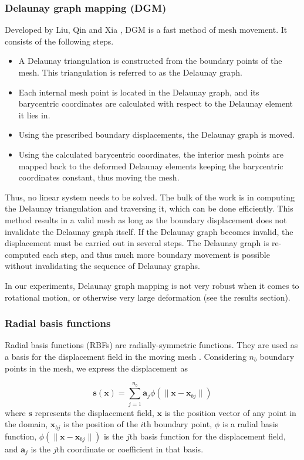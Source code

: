 \documentclass[letterpaper,11pt]{article}
\begin{document}
\subsubsection{Delaunay graph mapping (DGM)}
Developed by Liu, Qin and Xia \cite{mm:dgm}, DGM is a fast method of mesh movement. It consists of the following steps.
\begin{itemize}
\item A Delaunay triangulation is constructed from the boundary points of the mesh. This triangulation is referred to as the Delaunay graph.
\item Each internal mesh point is located in the Delaunay graph, and its barycentric coordinates are calculated with respect to the Delaunay element it lies in.
\item Using the prescribed boundary displacements, the Delaunay graph is moved.
\item Using the calculated barycentric coordinates, the interior mesh points are mapped back to the deformed Delaunay elements keeping the barycentric coordinates constant, thus moving the mesh.
\end{itemize}
Thus, no linear system needs to be solved. The bulk of the work is in computing the Delaunay triangulation and traversing it, which can be done efficiently. This method results in a valid mesh as long as the boundary displacement does not invalidate the Delaunay graph itself. If the Delaunay graph becomes invalid, the displacement must be carried out in several steps. The Delaunay graph is re-computed each step, and thus much more boundary movement is possible without invalidating the sequence of Delaunay graphs.

In our experiments, Delaunay graph mapping is not very robust when it comes to rotational motion, or otherwise very large deformation (see the results section).

\subsubsection{Radial basis functions}

Radial basis functions (RBFs) are radially-symmetric functions. They are used as a basis for the displacement field in the moving mesh \cite{mm:rbf}. Considering $n_b$ boundary points in the mesh, we express the displacement as

\begin{equation}
\mathbf{s}(\mathbf{x}) = \sum_{j=1}^{n_b} \mathbf{a}_j \phi(\lVert\mathbf{x} - \mathbf{x}_{bj}\rVert)
\label{eqn:rbf}
\end{equation}
where $\mathbf{s}$ represents the displacement field, $\mathbf{x}$ is the position vector of any point in the domain, $\mathbf{x}_{bj}$ is the position of the $i$th boundary point, $\phi$ is a radial basis function, $\phi(\lVert\mathbf{x} - \mathbf{x}_{bj}\rVert)$ is the $j$th basis function for the displacement field, and $\mathbf{a}_j$ is the $j$th coordinate or coefficient in that basis.
\end{document}
